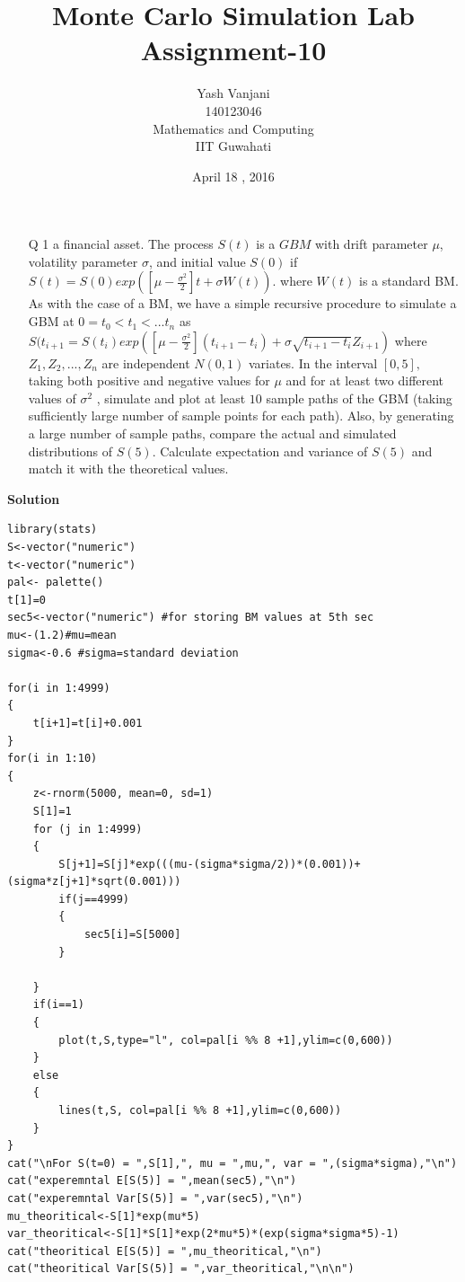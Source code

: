 \documentclass[12pt]{book}
\begin{document}
\title{\textbf{Monte Carlo Simulation Lab Assignment-10}}	
\author{Yash Vanjani\\140123046\\Mathematics and Computing\\IIT Guwahati}
\date{April 18 , 2016}

\maketitle

\newpage


\newpage
\begin{enumerate}
\item[Q 1]  a financial asset. The process ${S(t)}$ is a $GBM$ with drift parameter $\mu$, volatility parameter $\sigma$, and initial value $S(0)$ if \newline
$S(t) = S(0)exp([\mu-\frac{\sigma^2}{2}]t + \sigma W(t)).$ \newline
where ${W(t)}$ is a standard BM. As with the case of a BM, we have a simple
recursive procedure to simulate a GBM at $0=t_0 < t_1 < ... t_n$ as \newline
$S(t_{i+1} = S(t_i) exp([\mu - \frac {\sigma^2}{2}] (t_{i+1}-t_i) + \sigma
\sqrt{t_{i+1}-t_i}Z_{i+1})$ \newline
where $Z_1 , Z_2 ,..., Z_n$ are independent $N (0, 1)$ variates. In the
interval $[0, 5],$ taking both positive and negative values for $\mu$ and for at
least two different values of $\sigma^2$ , simulate and plot at least $10$ sample
paths of the GBM (taking sufficiently large number of sample points for each path).
Also, by generating a large number of sample paths, compare the actual and simulated
distributions of $S(5)$. Calculate expectation and variance of $S(5)$ and match it
with the theoretical values.\\
\end{enumerate}

\textbf{Solution} 



\begin{lstlisting}
library(stats)
S<-vector("numeric")
t<-vector("numeric")
pal<- palette()
t[1]=0
sec5<-vector("numeric") #for storing BM values at 5th sec
mu<-(1.2)#mu=mean
sigma<-0.6 #sigma=standard deviation

for(i in 1:4999)
{
	t[i+1]=t[i]+0.001
}
for(i in 1:10)
{
	z<-rnorm(5000, mean=0, sd=1)
	S[1]=1
	for (j in 1:4999)
	{
		S[j+1]=S[j]*exp(((mu-(sigma*sigma/2))*(0.001))+(sigma*z[j+1]*sqrt(0.001)))
		if(j==4999)
		{
			sec5[i]=S[5000]
		}

	}
	if(i==1)
	{
		plot(t,S,type="l", col=pal[i %% 8 +1],ylim=c(0,600))
	}
	else
	{
		lines(t,S, col=pal[i %% 8 +1],ylim=c(0,600))
	}
}
cat("\nFor S(t=0) = ",S[1],", mu = ",mu,", var = ",(sigma*sigma),"\n")
cat("experemntal E[S(5)] = ",mean(sec5),"\n")
cat("experemntal Var[S(5)] = ",var(sec5),"\n")
mu_theoritical<-S[1]*exp(mu*5)
var_theoritical<-S[1]*S[1]*exp(2*mu*5)*(exp(sigma*sigma*5)-1)
cat("theoritical E[S(5)] = ",mu_theoritical,"\n")
cat("theoritical Var[S(5)] = ",var_theoritical,"\n\n")
\end{lstlisting}
\newpage
\end{document}
